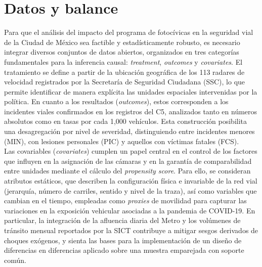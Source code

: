 \chapter{Datos y balance}

\noindent Para que el análisis del impacto del programa de fotocívicas en la seguridad vial de la Ciudad de México sea factible y estadísticamente robusto, es necesario integrar diversos conjuntos de datos abiertos, organizados en tres categorías fundamentales para la inferencia causal: \textit{treatment}, \textit{outcomes} y \textit{covariates}. El tratamiento se define a partir de la ubicación geográfica de los 113 radares de velocidad registrados por la Secretaría de Seguridad Ciudadana (SSC), lo que permite identificar de manera explícita las unidades espaciales intervenidas por la política. En cuanto a los resultados (\textit{outcomes}), estos corresponden a los incidentes viales confirmados en los registros del C5, analizados tanto en números absolutos como en tasas por cada 1{,}000 vehículos. Esta construcción posibilita una desagregación por nivel de severidad, distinguiendo entre incidentes menores (MIN), con lesiones personales (PIC) y aquellos con víctimas fatales (FCS).\\

Las covariables (\textit{covariates}) cumplen un papel central en el control de los factores que influyen en la asignación de las cámaras y en la garantía de comparabilidad entre unidades mediante el cálculo del \textit{propensity score}. Para ello, se consideran atributos estáticos, que describen la configuración física e invariable de la red vial (jerarquía, número de carriles, sentido y nivel de la traza), así como variables que cambian en el tiempo, empleadas como \textit{proxies} de movilidad para capturar las variaciones en la exposición vehicular asociadas a la pandemia de COVID-19. En particular, la integración de la afluencia diaria del Metro y los volúmenes de tránsito mensual reportados por la SICT contribuye a mitigar sesgos derivados de choques exógenos, y sienta las bases para la implementación de un diseño de diferencias en diferencias aplicado sobre una muestra emparejada con soporte común.

